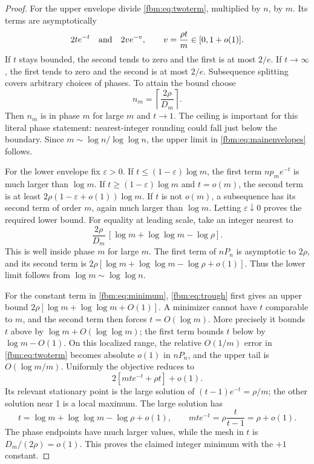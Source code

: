 \documentclass[11pt]{article}
\theoremstyle{remark}\newtheorem{remark}[theorem]{Remark}
\newcommand{\ceil}[1]{\left\lceil #1\right\rceil}
\begin{document}
\begin{proof}
For the upper envelope divide \eqref{fbm:eq:twoterm}, multiplied by $n$, by $m$. Its terms are asymptotically
\[
 2te^{-t}\quad\hbox{and}\quad 2ve^{-v},\qquad
 v=\frac{\rho t}{m}\in[0,1+o(1)].
\]
If $t$ stays bounded, the second tends to zero and the first is at most $2/e$. If $t\to\infty$, the first tends to zero and the second is at most $2/e$. Subsequence splitting covers arbitrary choices of phases. To attain the bound choose
\begin{equation}\label{fbm:eq:peak}
 n_m=\ceil{\frac{2\rho}{D_m}}.
\end{equation}
Then $n_m$ is in phase $m$ for large $m$ and $t\to1$. The ceiling is important for this literal phase statement: nearest-integer rounding could fall just below the boundary. Since $m\sim\log n/\log\log n$, the upper limit in \eqref{fbm:eq:mainenvelopes} follows.

For the lower envelope fix $\varepsilon>0$. If $t\leq(1-\varepsilon)\log m$, the first term $np_me^{-t}$ is much larger than $\log m$. If $t\geq(1-\varepsilon)\log m$ and $t=o(m)$, the second term is at least $2\rho(1-\varepsilon+o(1))\log m$. If $t$ is not $o(m)$, a subsequence has its second term of order $m$, again much larger than $\log m$. Letting $\varepsilon\downarrow0$ proves the required lower bound. For equality at leading scale, take an integer nearest to
\begin{equation}\label{fbm:eq:trough}
 \frac{2\rho}{D_m}\,[\log m+\log\log m-\log\rho].
\end{equation}
This is well inside phase $m$ for large $m$. The first term of $nP_n$ is asymptotic to $2\rho$, and its second term is
$2\rho[\log m+\log\log m-\log\rho+o(1)]$. Thus the lower limit follows from $\log m\sim\log\log n$.

For the constant term in \eqref{fbm:eq:minimum}, \eqref{fbm:eq:trough} first gives an upper bound $2\rho[\log m+\log\log m+O(1)]$. A minimizer cannot have $t$ comparable to $m$, and the second term then forces $t=O(\log m)$. More precisely it bounds $t$ above by $\log m+O(\log\log m)$; the first term bounds $t$ below by $\log m-O(1)$. On this localized range, the relative $O(1/m)$ error in \eqref{fbm:eq:twoterm} becomes absolute $o(1)$ in $nP_n$, and the upper tail is $O(\log m/m)$. Uniformly the objective reduces to
\begin{equation}\label{fbm:eq:localmin}
 2[mt e^{-t}+\rho t]+o(1).
\end{equation}
Its relevant stationary point is the large solution of
$(t-1)e^{-t}=\rho/m$; the other solution near 1 is a local maximum. The large solution has
\[
 t=\log m+\log\log m-\log\rho+o(1),\qquad
 mt e^{-t}=\rho\frac{t}{t-1}=\rho+o(1).
\]
The phase endpoints have much larger values, while the mesh in $t$ is $D_m/(2\rho)=o(1)$. This proves the claimed integer minimum with the $+1$ constant.
\end{proof}
\end{document}
